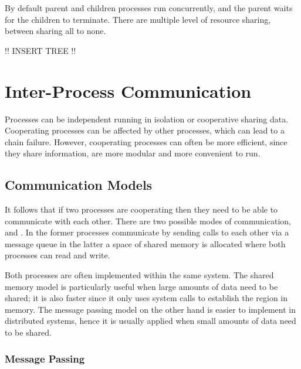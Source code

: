 	\par{By default parent and children processes run concurrently, and the parent waits for the children to terminate. There are multiple level of resource sharing, between sharing all to none.}


	!! INSERT TREE !!


\section{Inter-Process Communication}

	\par{Processes can be independent running in isolation or cooperative sharing data. Cooperating processes can be affected by other processes, which can lead to a chain failure. However, cooperating processes can often be more efficient, since they share information, are more modular and more convenient to run.}

	\subsection{Communication Models}

		\par{It follows that if two processes are cooperating then they need to be able to communicate with each other. There are two possible modes of communication,  and . In the former processes communicate by sending calls to each other via a message queue in the latter a space of shared memory is allocated where  both processes can read and write.}
		\par{Both processes are often implemented within the same system. The shared memory model is particularly useful when large amounts of data need to be shared; it is also faster since it only uses system calls to establish the region in memory. The message passing model on the other hand is easier to implement in distributed systems, hence it is usually applied when small amounts of data need to be shared.}


	\subsubsection{Message Passing}

